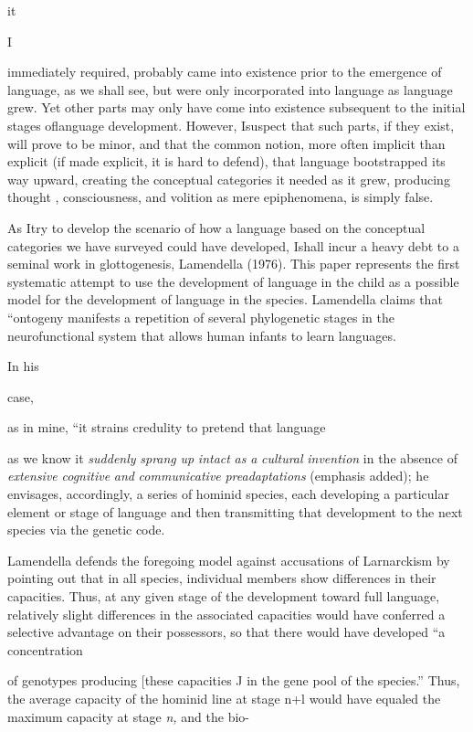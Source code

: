 it

I


immediately required, probably came into existence prior to the emergence of language, as we shall see, but were only incorporated into language as language grew. Yet other parts may only have come into existence subsequent to the initial stages oflanguage development. However, Isuspect that such parts, if they exist, will prove to be minor, and that the common notion, more often implicit than explicit (if made explicit, it is hard to defend), that language bootstrapped its way upward, creating the conceptual categories it needed as it grew, pro\-ducing thought , consciousness, and volition as mere epiphenomena, is simply false.

As Itry to develop the scenario of how a language based on the conceptual categories we have surveyed could have developed, Ishall incur a heavy debt to a seminal work in glottogenesis, Lamen\-della (1976). This paper represents the first systematic attempt to use the development of language in the child as a possible model for the development of language in the species. Lamendella claims that ``on\-togeny manifests a repetition of several phylogenetic stages in the neurofunctional system that allows human infants to learn languages.{\textquotedbl}

In his

case,

as in mine, ``it strains credulity to pretend that language

as we know it \textit{suddenly} \textit{sprang} \textit{up} \textit{intact} \textit{as} \textit{a} \textit{cultural} \textit{invention} in the absence of \textit{extensive} \textit{cognitive} \textit{and} \textit{communicative} \textit{preadaptations{\textquotedbl}} (emphasis added); he envisages, accordingly, a series of hominid species, each developing a particular element or stage of language and then transmitting that development to the next species via the genetic code. 

Lamendella defends the foregoing model against accusations of Larnarckism by pointing out that in all species, individual members show differences in their capacities. Thus, at any given stage of the development toward full language, relatively slight differences in the associated capacities would have conferred a selective advantage on their possessors, so that there would have developed ``a concentration

of genotypes producing [these capacities J in the gene pool of the species.'' Thus, the average capacity of the hominid line at stage n+l would have equaled the maximum capacity at stage \textit{n,} and the bio-

